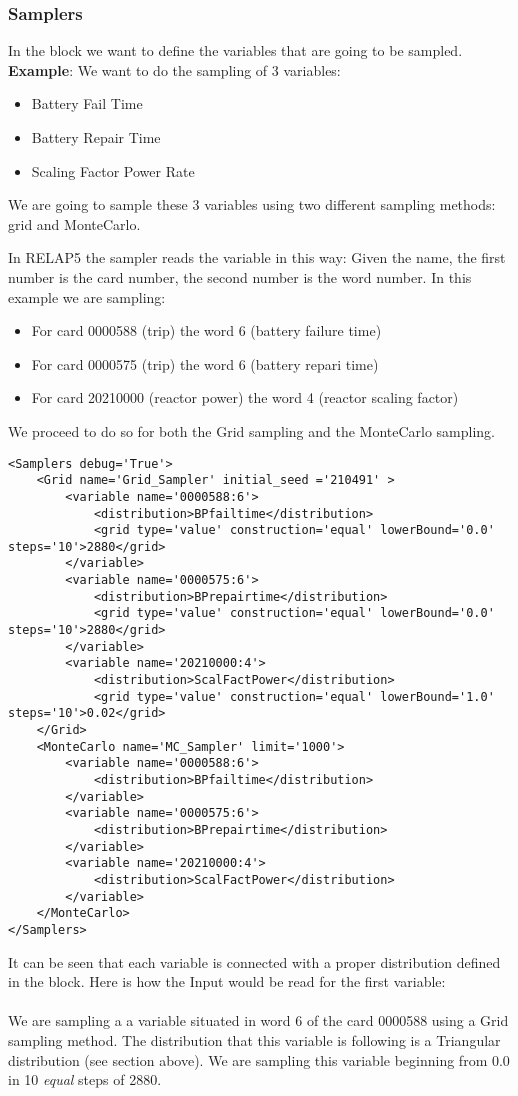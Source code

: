 \subsubsection{Samplers}
In the  block we want to define the variables that are going to be
sampled.
%
\textbf{Example}:
We want to do the sampling of 3 variables:
\begin{itemize}
  \item Battery Fail Time
  \item Battery Repair Time
  \item Scaling Factor Power Rate
\end{itemize}
We are going to sample these 3 variables using two different sampling methods:
grid and MonteCarlo.

In RELAP5 the sampler reads the variable in this way:
Given the name, the first number is the card number, the second number is the
word number.
%
In this example we are sampling:
\begin{itemize}
  \item For card 0000588 (trip) the word 6 (battery failure time)
  \item For card 0000575 (trip) the word 6 (battery repari time)
  \item For card 20210000 (reactor power) the word 4 (reactor scaling factor)
\end{itemize}

We proceed to do so for both the Grid sampling and the MonteCarlo sampling.

\begin{lstlisting}[style=XML]
<Samplers debug='True'>
    <Grid name='Grid_Sampler' initial_seed ='210491' >
        <variable name='0000588:6'>
            <distribution>BPfailtime</distribution>
            <grid type='value' construction='equal' lowerBound='0.0' steps='10'>2880</grid>
        </variable>
        <variable name='0000575:6'>
            <distribution>BPrepairtime</distribution>
            <grid type='value' construction='equal' lowerBound='0.0' steps='10'>2880</grid>
        </variable>
		<variable name='20210000:4'>
            <distribution>ScalFactPower</distribution>
            <grid type='value' construction='equal' lowerBound='1.0' steps='10'>0.02</grid>
	</Grid>
	<MonteCarlo name='MC_Sampler' limit='1000'>
		<variable name='0000588:6'>
            <distribution>BPfailtime</distribution>
		</variable>
		<variable name='0000575:6'>
            <distribution>BPrepairtime</distribution>
		</variable>
		<variable name='20210000:4'>
            <distribution>ScalFactPower</distribution>
		</variable>
	</MonteCarlo>
</Samplers>
\end{lstlisting}
It can be seen that each variable is connected with a proper distribution
defined in the  block.
%
Here is how the Input would be read for the first variable:
\\\\
We are sampling a a variable situated in word 6 of the card 0000588 using a Grid
sampling method.
%
The distribution that this variable is following is a Triangular distribution
(see section above).
%
We are sampling this variable beginning from 0.0 in 10 \textit{equal} steps of
2880.
%
